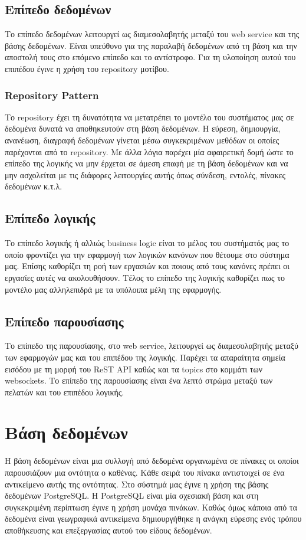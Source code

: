 \subsection{Επίπεδο δεδομένων}
Το επίπεδο δεδομένων λειτουργεί ως διαμεσολαβητής μεταξύ του web service και της βάσης δεδομένων. Είναι υπεύθυνο για της παραλαβή δεδομένων από τη βάση και την αποστολή τους στο επόμενο επίπεδο και το αντίστροφο. Για τη υλοποίηση αυτού του επιπέδου έγινε η χρήση του repository μοτίβου.

\subsubsection{Repository Pattern}
Το repository έχει τη δυνατότητα να μετατρέπει το μοντέλο του συστήματος μας σε δεδομένα δυνατά να αποθηκευτούν στη βάση δεδομένων. Η εύρεση, δημιουργία, ανανέωση, διαγραφή δεδομένων γίνεται μέσω συγκεκριμένων μεθόδων οι οποίες παρέχονται από το repository. Με άλλα λόγια παρέχει μία αφαιρετική δομή ώστε το επίπεδο της λογικής να μην έρχεται σε άμεση επαφή με τη βάση δεδομένων και να μην ασχολείται με τις διάφορες λειτουργίες αυτής όπως σύνδεση, εντολές, πίνακες δεδομένων κ.τ.λ. 

\subsection{Επίπεδο λογικής}
Το επίπεδο λογικής ή αλλιώς business logic είναι το μέλος του συστήματός μας το οποίο φροντίζει για την εφαρμογή των λογικών κανόνων που θέτουμε στο σύστημα μας. Επίσης καθορίζει τη ροή των εργασιών και ποιους από τους κανόνες πρέπει οι εργασίες αυτές να ακολουθήσουν. Τέλος το επίπεδο της λογικής καθορίζει πως το μοντέλο μας αλληλεπιδρά με τα υπόλοιπα μέλη της εφαρμογής.

\subsection{Επίπεδο παρουσίασης}
Το επίπεδο της παρουσίασης, στο web service, λειτουργεί ως διαμεσολαβητής μεταξύ των εφαρμογών μας και του επιπέδου της λογικής. Παρέχει τα απαραίτητα σημεία εισόδου με τη μορφή του ReST API καθώς και τα topics στο κομμάτι των websockets. Το επίπεδο της παρουσίασης είναι ένα λεπτό στρώμα μεταξύ των πελατών και του επιπέδου λογικής. 

\section{Βάση δεδομένων}
Η βάση δεδομένων είναι μια συλλογή από δεδομένα οργανωμένα σε πίνακες οι οποίοι παρουσιάζουν μια οντότητα ο καθένας. Κάθε σειρά του πίνακα αντιστοιχεί σε ένα αντικείμενο αυτής της οντότητας. Στο σύστημά μας έγινε η χρήση της βάσης δεδομένων PostgreSQL. Η PostgreSQL είναι μία σχεσιακή βάση και στη συγκεκριμένη περίπτωση έγινε η χρήση μονάχα πινάκων. Καθώς όμως κάποια από τα δεδομένα είναι γεωγραφικά αντικείμενα δημιουργήθηκε η ανάγκη εύρεσης ενός τρόπου αποθήκευσης και επεξεργασίας αυτού του είδους δεδομένων.

